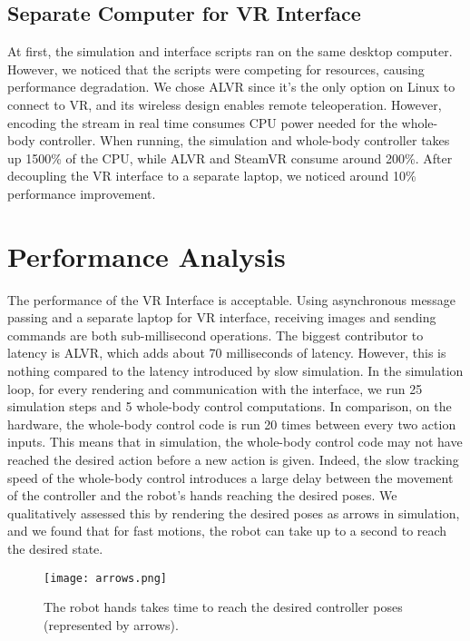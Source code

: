 \subsection{Separate Computer for VR Interface}

At first, the simulation and interface scripts ran on the same desktop computer. However, we noticed that the scripts were competing for resources, causing performance degradation. We chose ALVR since it's the only option on Linux to connect to VR, and its wireless design enables remote teleoperation. However, encoding the stream in real time consumes CPU power needed for the whole-body controller. When running, the simulation and whole-body controller takes up 1500\% of the CPU, while ALVR and SteamVR consume around 200\%. After decoupling the VR interface to a separate laptop, we noticed around 10\% performance improvement.

\section{Performance Analysis}
The performance of the VR Interface is acceptable. Using asynchronous message passing and a separate laptop for VR interface, receiving images and sending commands are both sub-millisecond operations. The biggest contributor to latency is ALVR, which adds about 70 milliseconds of latency. However, this is nothing compared to the latency introduced by slow simulation. In the simulation loop, for every rendering and communication with the interface, we run 25 simulation steps and 5 whole-body control computations. In comparison, on the hardware, the whole-body control code is run 20 times between every two action inputs. This means that in simulation, the whole-body control code may not have reached the desired action before a new action is given. Indeed, the slow tracking speed of the whole-body control introduces a large delay between the movement of the controller and the robot's hands reaching the desired poses. We qualitatively assessed this by rendering the desired poses as arrows in simulation, and we found that for fast motions, the robot can take up to a second to reach the desired state. 
\begin{figure}
	\centering
	\texttt{[image: arrows.png]}
	\caption{The robot hands takes time to reach the desired controller poses (represented by arrows).}
    \label{fig:arrows}
\end{figure}

